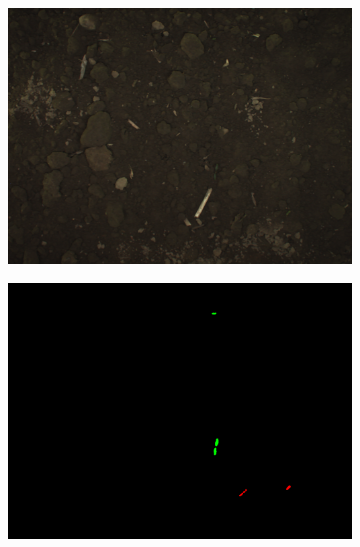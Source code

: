 \documentclass[letterpaper, 10 pt, conference]{ieeeconf}  %
\begin{document}
    \begin{figure}
	\vspace{1em} 
    \centering
     \begin{subfigure}[b]{0.49\linewidth}
    \includegraphics[width=\linewidth]{pics/bonn/images/bonirob_2016-04-28-12-20-29_6_frame217.png}
   		\caption{}
		\label{bonn_img}    		
    \vspace{1em}
   \end{subfigure}
        \begin{subfigure}[b]{0.49\linewidth}
    \includegraphics[width=\linewidth]{pics/bonn/annotations/bonirob_2016-04-28-12-20-29_6_frame217.png}
   		\caption{}
		\label{bonn_lbl}    		
    \vspace{1em}

\end{subfigure}
\end{figure}
\end{document}
